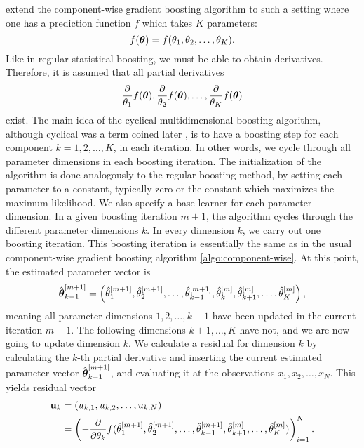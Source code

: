\citet{schmid} extend the component-wise gradient boosting algorithm \citep{friedman2001} to such a setting where one has a prediction function $f$ which takes $K$ parameters:
\begin{equation}
    f(\boldsymbol{\theta})=f(\theta_1,\theta_2,\ldots,\theta_K).
\end{equation}
Like in regular statistical boosting, we must be able to obtain derivatives. Therefore, it is assumed that all partial derivatives
\begin{equation}
    \frac{\partial}{\theta_1}f(\boldsymbol{\theta}),\frac{\partial}{\theta_2}f(\boldsymbol{\theta}),\ldots,\frac{\partial}{\theta_K}f(\boldsymbol{\theta})
\end{equation}
exist. The main idea of the cyclical multidimensional boosting algorithm, although cyclical was a term coined later \citep{thomas2018}, is to have a boosting step for each component $k=1,2,\ldots,K$, in each iteration. In other words, we cycle through all parameter dimensions in each boosting iteration. The initialization of the algorithm is done analogously to the regular boosting method, by setting each parameter to a constant, typically zero or the constant which maximizes the maximum likelihood. We also specify a base learner for each parameter dimension. In a given boosting iteration $m+1$, the algorithm cycles through the different parameter dimensions $k$. In every dimension $k$, we carry out one boosting iteration. This boosting iteration is essentially the same as in the usual component-wise gradient boosting algorithm \eqref{algo:component-wise}. At this point, the estimated parameter vector is
\begin{equation*}
    \hat{\boldsymbol{\theta}}_{k-1}^{[m+1]}=\left(\hat{\theta}_1^{[m+1]},\hat{\theta}_2^{[m+1]},\ldots,\hat{\theta}_{k-1}^{[m+1]},\hat{\theta}_{k}^{[m]},\hat{\theta}_{k+1}^{[m]},\ldots,\hat{\theta}_{K}^{[m]}\right),
\end{equation*}
meaning all parameter dimensions $1,2,\ldots,k-1$ have been updated in the current iteration $m+1$. The following dimensions $k+1,\ldots,K$ have not, and we are now going to update dimension $k$. We calculate a residual for dimension $k$ by calculating the $k$-th partial derivative and inserting the current estimated parameter vector $\hat{\boldsymbol{\theta}}_{k-1}^{[m+1]}$, and evaluating it at the observations $x_1,x_2,\ldots,x_N$. This yields residual vector
\begin{align*}
\mathbf{u}_k&=(u_{k,1},u_{k,2},\ldots,u_{k,N})\\
&=\left(-\frac{\partial}{\partial \theta_k}f(\hat{\theta}_1^{[m+1]},\hat{\theta}_2^{[m+1]},\ldots,\hat{\theta}_{k-1}^{[m+1]},\hat{\theta}_{k+1}^{[m]},\ldots,\hat{\theta}_{K}^{[m]})\right)_{i=1}^N.
\end{align*}
